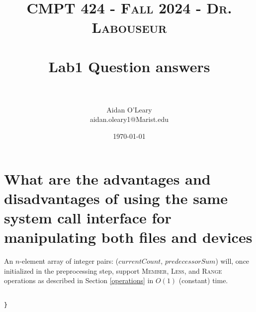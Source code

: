 \documentclass[letterpaper, 10pt,DIV=13]{scrartcl}
\title{	
   \normalfont \normalsize 
   \textsc{CMPT 424 - Fall 2024 - Dr. Labouseur} \\[10pt] %
   \horrule{0.5pt} \\[0.25cm] 	%
   \huge Lab1 Question answers  \\     	    %
   \horrule{0.5pt} \\[0.25cm] 	%
}
\author{Aidan O'Leary \\ \normalsize aidan.oleary1@Marist.edu}
\date{\normalsize\today} 	%
\numberwithin{equation}{section} %
\numberwithin{figure}{section} %
\numberwithin{table}{section} %
\begin{document}
\maketitle %

\section{What are the advantages and disadvantages of using the same system call interface for manipulating both files and devices}

An $n$-element array of integer pairs: ($currentCount$, $predecessorSum$) will, once initialized in the preprocessing step,  support \textsc{Member}, \textsc{Less}, and \textsc{Range} operations as described in Section \ref{operations} in $O(1)$ (constant) time.





\lstset{numbers=left, numberstyle=\tiny, stepnumber=1, numbersep=5pt, basicstyle=\footnotesize\ttfamily}
\begin{lstlisting}[frame=single, ]  

}
\end{lstlisting}
\end{document}
